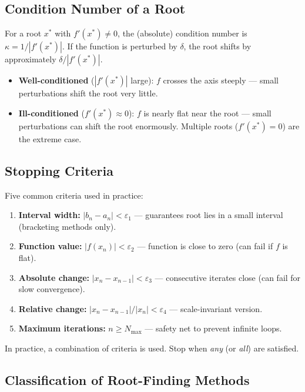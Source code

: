 \documentclass[12pt]{article}
\begin{document}
\subsection*{Condition Number of a Root}

\begin{defbox}
For a root $x^*$ with $f'(x^*)\neq 0$, the (absolute) condition number is $\kappa = 1/|f'(x^*)|$. If the function is perturbed by $\delta$, the root shifts by approximately $\delta/|f'(x^*)|$.
\begin{itemize}[noitemsep,topsep=4pt]
  \item \textbf{Well-conditioned} ($|f'(x^*)|$ large): $f$ crosses the axis steeply — small perturbations shift the root very little.
  \item \textbf{Ill-conditioned} ($f'(x^*)\approx 0$): $f$ is nearly flat near the root — small perturbations can shift the root enormously. Multiple roots ($f'(x^*)=0$) are the extreme case.
\end{itemize}
\end{defbox}

\subsection*{Stopping Criteria}

Five common criteria used in practice:
\begin{enumerate}[noitemsep]
  \item \textbf{Interval width:} $|b_n-a_n|<\varepsilon_1$ — guarantees root lies in a small interval (bracketing methods only).
  \item \textbf{Function value:} $|f(x_n)|<\varepsilon_2$ — function is close to zero (can fail if $f$ is flat).
  \item \textbf{Absolute change:} $|x_n-x_{n-1}|<\varepsilon_3$ — consecutive iterates close (can fail for slow convergence).
  \item \textbf{Relative change:} $|x_n-x_{n-1}|/|x_n|<\varepsilon_4$ — scale-invariant version.
  \item \textbf{Maximum iterations:} $n\geq N_{\max}$ — safety net to prevent infinite loops.
\end{enumerate}
In practice, a combination of criteria is used. Stop when \textit{any} (or \textit{all}) are satisfied.

\bigskip

\subsection*{Classification of Root-Finding Methods}
\end{document}
